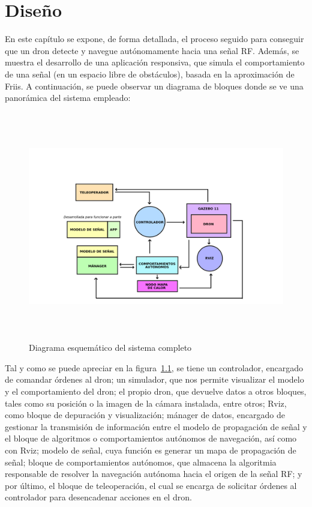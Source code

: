 \chapter{Diseño}
\label{cap:capitulo4}

En este capítulo se expone, de forma detallada, el proceso seguido para conseguir que un dron detecte y navegue autónomamente hacia una señal \ac{RF}. Además, se muestra el desarrollo de una aplicación responsiva, que simula el comportamiento de una señal (en un espacio libre de obstáculos), basada en la aproximación de Friis. A continuación, se puede observar un diagrama de bloques donde se ve una panorámica del sistema empleado:

\begin{figure} [t]
	\begin{center}
	\includegraphics[height=10cm]{imagenes/cap4/0_diagrama_general.png}
	\end{center}
	\caption[Diagrama esquemático del sistema completo]{Diagrama esquemático del sistema completo}
	\label{fig:diagrama}
\end{figure}

Tal y como se puede apreciar en la figura~\ref{fig:diagrama}, se tiene un controlador, encargado de comandar órdenes al dron; un simulador, que nos permite visualizar el modelo y el comportamiento del dron; el propio dron, que devuelve datos a otros bloques, tales como su posición o la imagen de la cámara instalada, entre otros; Rviz, como bloque de depuración y visualización; mánager de datos, encargado de gestionar la transmisión de información entre el modelo de propagación de señal y el bloque de algoritmos o comportamientos autónomos de navegación, así como con Rviz; modelo de señal, cuya función es generar un mapa de propagación de señal; bloque de comportamientos autónomos, que almacena la algoritmia responsable de resolver la navegación autónoma hacia el origen de la señal \ac{RF}; y por último, el bloque de teleoperación, el cual se encarga de solicitar órdenes al controlador para desencadenar acciones en el dron.

